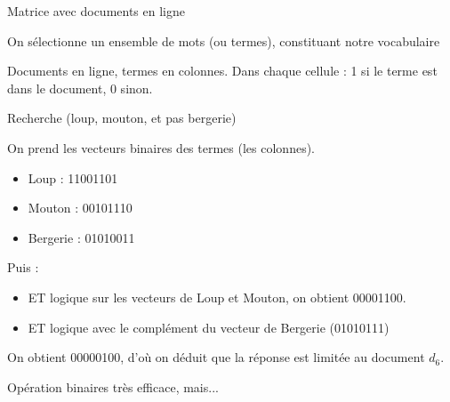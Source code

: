 \begin{frame}{Matrice avec documents en ligne}

  On sélectionne un ensemble de mots (ou \alert{termes}), constituant notre
  \alert{vocabulaire}

  \vfill



  \vfill
\begin{blocgauche}
  Documents en ligne, termes en colonnes. Dans chaque cellule : 1 si le terme est dans
  le document, 0 sinon.
\end{blocgauche}
\end{frame}


\begin{frame}{Recherche (loup, mouton, et pas bergerie)}

On prend les vecteurs binaires des \alert{termes} (les colonnes).

\begin{itemize}
  \item Loup :      11001101
  \item Mouton :    00101110
  \item Bergerie :    01010011
\end{itemize}

\vfill

Puis :

\begin{itemize}
  \item ET logique sur les vecteurs de Loup et Mouton, on obtient  00001100.
  \item ET logique  avec le \alert{complément} du vecteur de Bergerie (01010111)
\end{itemize}

\vfill
\begin{blocgauche}
On obtient 00000100, d'où on déduit que la réponse est limitée au document $d_6$.

Opération binaires \alert{très efficace}, mais...
\end{blocgauche}
\end{frame}



